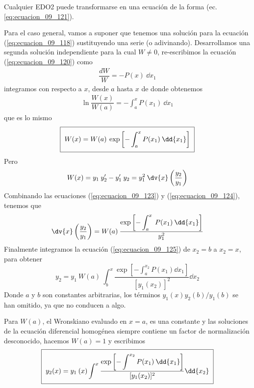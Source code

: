 Cualquier EDO2 puede transformarse en una ecuación de la forma (ec. \ref{eq:ecuacion_09_121}).
\par
Para el caso general, vamos a suponer que tenemos una solución para la ecuación (\ref{eq:ecuacion_09_118}) sustituyendo una serie (o adivinando). Desarrollamos una segunda solución independiente para la cual $W \neq 0$, re-escribimos la ecuación (\ref{eq:ecuacion_09_120}) como
\begin{align*}
\dfrac{d W}{W} = - P(x) \: \dd{x_{1}}
\end{align*}
integramos con respecto a $x$, desde $a$ hasta $x$ de donde obtenemos
\begin{align*}
\ln \dfrac{W(x)}{W(a)} = - \int_{a}^{x} P(x_{1}) \: \dd{x_{1}}
\end{align*}
que es lo mismo
\begin{equation}
\setlength{\fboxsep}{2\fboxsep}\boxed{W(x) = W(a) \: \exp \left[ - \int_{a}^{x} P(x_{1}) \: \dd{x_{1}} \right]}
\label{eq:ecuacion_09_123}
\end{equation}
Pero
\begin{equation}
W(x) = y_{1} \: y^{\prime}_{2} - y^{\prime}_{1} \: y_{2} = y_{1}^{2} \: \dv{x} \left( \dfrac{y_{2}}{y_{1}} \right)
\label{eq:ecuacion_09_124}
\end{equation}
Combinando las ecuaciones (\ref{eq:ecuacion_09_123}) y (\ref{eq:ecuacion_09_124}), tenemos que
\begin{equation}
\dv{x} \left( \dfrac{y_{2}}{y_{1}} \right) =  W(a) \: \dfrac{\exp \left[\displaystyle - \int_{a}^{x} \: P(x_{1}) \: \dd{x_{1}} \right]}{y^{2}_{1}}
\label{eq:ecuacion_09_125}
\end{equation}
Finalmente integramos la ecuación (\ref{eq:ecuacion_09_125}) de $x_{2} = b$ a $x_{2} = x$, para obtener
\begin{equation}
y_{2} = y_{1} \: W(a) \: \int_{b}^{x} \dfrac{\exp \left[ \displaystyle - \int_{a}^{x_{2}} P(x_{1}) \dd{x_{1}} \right]}{[y_{1}(x_{2})]^{2}} \dd{x_{2}}
\label{eq:ecuacion_09_126}
\end{equation}
Donde $a$ y $b$ son constantes arbitrarias, los términos $y_{1}(x)y_{2}(b)/y_{1}(b)$ se han omitido, ya que no conducen a algo.
\par
Para $W(a)$, el Wronskiano evaluado en $x=a$, es una constante y las soluciones de la ecuación diferencial homogénea siempre contiene un factor de normalización desconocido, hacemos $W(a)=1$ y escribimos
\begin{equation}
\setlength{\fboxsep}{2\fboxsep}\boxed{y_{2}(x) =  y_{1} \: (x) \int^{x} \dfrac{\exp \left[ \displaystyle - \int^{x_{2}} P(x_{1}) \: \dd{x_{1}} \right]}{[y_{1}(x_{2})]^{2}} \dd{x_{2}}}
\label{eq:ecuacion_09_127}
\end{equation}
